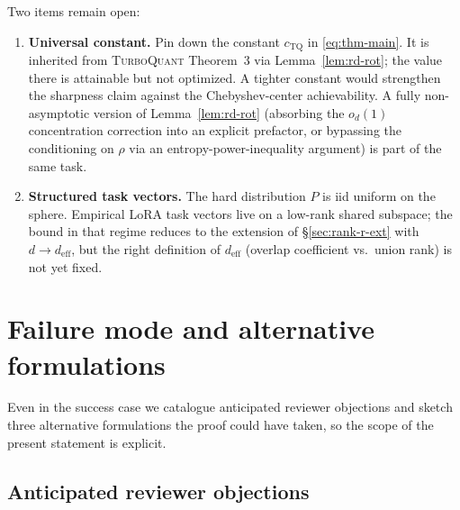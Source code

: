 \documentclass{article}
\theoremstyle{remark}
\begin{document}
Two items remain open:
\begin{enumerate}
  \item \textbf{Universal constant.} Pin down the constant
  $c_{\mathrm{TQ}}$ in \eqref{eq:thm-main}. It is inherited from
  \textsc{TurboQuant} Theorem~3 via Lemma~\ref{lem:rd-rot}; the value
  there is attainable but not optimized. A tighter constant would
  strengthen the sharpness claim against the Chebyshev-center
  achievability. A fully non-asymptotic version of Lemma~\ref{lem:rd-rot}
  (absorbing the $o_d(1)$ concentration correction into an explicit
  prefactor, or bypassing the conditioning on $\rho$ via an
  entropy-power-inequality argument) is part of the same task.
  \item \textbf{Structured task vectors.} The hard distribution $P$
  is iid uniform on the sphere. Empirical LoRA task vectors live on a
  low-rank shared subspace; the bound in that regime reduces to the
  extension of \S\ref{sec:rank-r-ext} with $d \to d_{\mathrm{eff}}$,
  but the right definition of $d_{\mathrm{eff}}$ (overlap coefficient
  vs.\ union rank) is not yet fixed.
\end{enumerate}

\section{Failure mode and alternative formulations}\label{sec:failure}

Even in the success case we catalogue anticipated
reviewer objections and sketch three alternative formulations the proof
could have taken, so the scope of the present statement is explicit.

\subsection{Anticipated reviewer objections}\label{sec:failure-obj}
\end{document}
